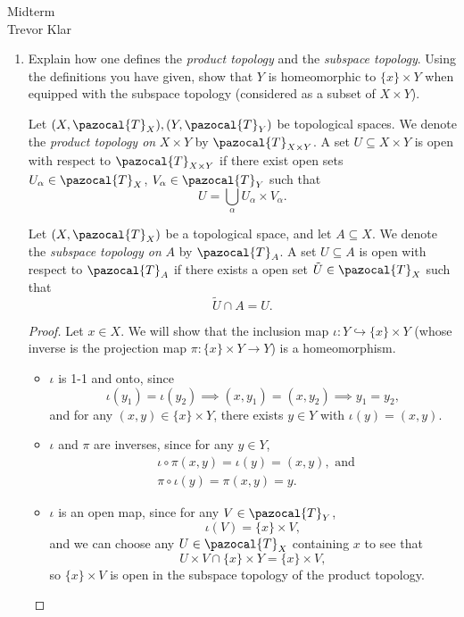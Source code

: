 \documentclass[12pt,letterpaper]{article}
\begin{document}
\thispagestyle{fancy}
\begin{center}
{{\Large Midterm} \\Trevor Klar }%
\end{center}

\pagebreak
\begin{enumerate}
\item Explain how one defines the \emph{product topology} and the \emph{subspace topology}. Using the definitions you have given, show that $Y$ is homeomorphic to $\{x\}\times Y$ when equipped with the subspace topology (considered as a subset of $X\times Y$).
\begin{definition*}
Let $(X,\pazocal{T}_X), (Y,\pazocal{T}_Y)$ be topological spaces. We denote the \emph{product topology on} $X\times Y$ by $\pazocal{T}_{X\times Y}$. A set $U\subseteq X\times Y$ is open with respect to $\pazocal{T}_{X\times Y}$ if there exist open sets $U_\alpha\in \pazocal{T}_X$, $V_\alpha\in \pazocal{T}_Y$ such that 
$$U=\bigcup_\alpha U_\alpha\times V_\alpha.$$
\end{definition*}
\begin{definition*}
Let $(X,\pazocal{T}_X)$ be a topological space, and let $A\subseteq X$. We denote the \emph{subspace topology on} $A$ by $\pazocal{T}_A$. A set $U\subseteq A$ is open with respect to $\pazocal{T}_A$ if there exists a open set $\tilde{U}\in\pazocal{T}_X$ such that 
$$\tilde{U}\cap A=U.$$ 
\end{definition*}
\begin{proof}
Let $x\in X$. We will show that the inclusion map $\iota:Y\hookrightarrow\{x\}\times Y$ (whose inverse is the projection map $\pi:\{x\}\times Y\to Y$) is a homeomorphism.
	\begin{itemize}
	\item $\iota$ is 1-1 and onto, since 
	$$\iota(y_1)=\iota(y_2)\implies(x,y_1)=(x,y_2)\implies y_1=y_2,$$
	and for any $(x,y)\in \{x\}\times Y$, there exists $y\in Y$ with $\iota(y)=(x,y)$.
	
	\item $\iota$ and $\pi$ are inverses, since for any $y\in Y$,
	\begin{align*}
	&\iota\circ\pi(x,y)=\iota(y)=(x,y), \text{ and } \\
	&\pi\circ\iota(y)=\pi(x,y)=y.
	\end{align*}
	
	\item $\iota$ is an open map, since for any $V\in\pazocal{T}_Y$, 
	$$\iota(V)=\{x\}\times V,$$
	and we can choose any $U\in\pazocal{T}_X$ containing $x$ to see that 
	$$U\times V \cap \{x\}\times Y = \{x\}\times V,$$ 
	so $\{x\}\times V$ is open in the subspace topology of the product topology. 
	

\end{itemize}
\end{proof}
\end{enumerate}
\end{document}
